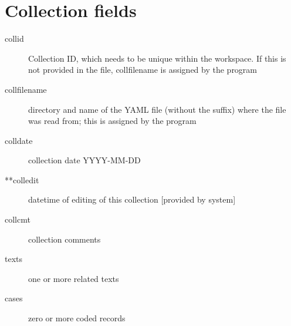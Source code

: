 \documentclass[letterpaper,10pt,english]{sphinxmanual}
\begin{document}
\section{Collection fields}
\label{appendix2:collection-fields}\begin{description}
\item[{collid}] \leavevmode
Collection ID, which needs to be unique within the workspace. If
this is not provided in the file, collfilename is assigned by the
program

\item[{collfilename}] \leavevmode
directory and name of the YAML file (without the suffix) where the
file was read from; this is assigned by the program

\item[{colldate}] \leavevmode
collection date YYYY-MM-DD

\item[{**colledit}] \leavevmode
datetime of editing of this collection  {[}provided by system{]}

\item[{collcmt}] \leavevmode
collection comments

\item[{texts}] \leavevmode
one or more related texts

\item[{cases}] \leavevmode
zero or more coded records

\end{description}
\end{document}
